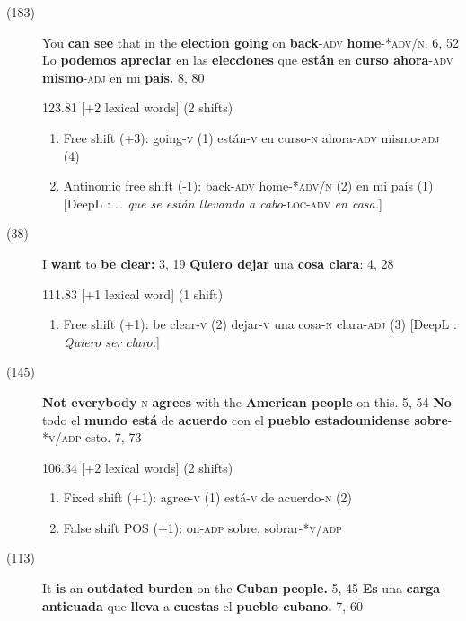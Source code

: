 \documentclass[output=paper]{langsci/langscibook}
\begin{document}
\begin{description}
  \item[(183)] You \textbf{can see} that in the \textbf{election going} on \textbf{back}\textsc{-adv} \textbf{home}\textsc{-*adv/n}. 6, 52 \rightarrow Lo \textbf{podemos apreciar} en las \textbf{elecciones} que \textbf{están} en \textbf{curso ahora}\textsc{-adv} \textbf{mismo}\textsc{-adj} en mi \textbf{país.} 8, 80

    123.81 [+2 lexical words] (2 shifts)

    \begin{enumerate}
      \item Free shift (+3): going-\textsc{v} (1) \rightarrow están-\textsc{v} en curso-\textsc{n} ahora-\textsc{adv} mismo-\textsc{adj} (4)
      \item Antinomic free shift (-1): back-\textsc{adv} home-*\textsc{adv/n} (2) \rightarrow en mi país (1) [DeepL : \textit{… que se están llevando a cabo}\textsc{-loc-adv}\textit{ en casa.}]
    \end{enumerate}

  \item[(38)] I \textbf{want} to \textbf{be clear:} 3, 19 \rightarrow \textbf{Quiero dejar} una \textbf{cosa clara}: 4, 28

    111.83 [+1 lexical word] (1 shift)

    \begin{enumerate}
      \item Free shift (+1): be clear-\textsc{v} (2) \rightarrow dejar-\textsc{v} una cosa-\textsc{n} clara-\textsc{adj} (3) [DeepL : \textit{Quiero ser claro:}]
    \end{enumerate}

  \item[(145)] \textbf{Not everybody}\textsc{-n} \textbf{agrees} with the \textbf{American people} on this. 5, 54 \rightarrow \textbf{No} todo el \textbf{mundo está} de \textbf{acuerdo} con el \textbf{pueblo estadounidense} \textbf{sobre}\textsc{-*v/adp} esto. 7, 73

    106.34 [+2 lexical words] (2 shifts)

    \begin{enumerate}
      \item Fixed shift (+1): agree-\textsc{v} (1) \rightarrow está-\textsc{v} de acuerdo-\textsc{n} (2)
      \item False shift POS (+1): on-\textsc{adp} \rightarrow sobre, sobrar-*\textsc{v/adp}
    \end{enumerate}

  \item[(113)] It \textbf{is} an \textbf{outdated burden} on the \textbf{Cuban people.} 5, 45 \rightarrow \textbf{Es} una \textbf{carga anticuada} que \textbf{lleva} a \textbf{cuestas} el \textbf{pueblo cubano.} 7, 60


\end{description}
\end{document}
